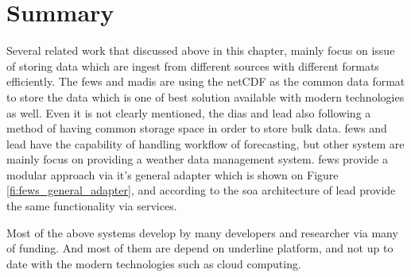 \section{Summary}
\label{se:lit_summary}
Several related work that discussed above in this chapter, mainly focus on issue of storing data which are ingest from different sources with different formats efficiently. The \acrshort{fews} and \acrshort{madis} are using the \acrshort{netCDF} as the common data format to store the data which is one of best solution available with modern technologies as well. Even it is not clearly mentioned, the \acrshort{dias} and \acrshort{lead} also following a method of having common storage space in order to store bulk data.
\acrshort{fews} and \acrshort{lead} have the capability of handling workflow of forecasting, but other system are mainly focus on providing a weather data management system.
\acrshort{fews} provide a modular approach via it's general adapter which is shown on Figure \ref{fi:fews_general_adapter}, and according to the \acrshort{soa} architecture of \acrshort{lead} provide the same functionality via services.

Most of the above systems develop by many developers and researcher via many of funding. And most of them are depend on underline platform, and not up to date with the modern technologies such as cloud computing.
